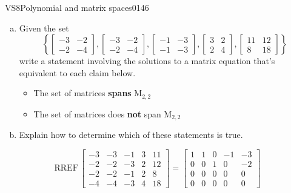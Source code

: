\newpage




\begin{exercise}{VS8}{Polynomial and matrix spaces}{0146} 
\begin{exerciseStatement} 

\begin{enumerate}[(a)]
\item  

 Given the set \[\left\{ \left[\begin{array}{cc}
-3 & -2 \\
-2 & -4
\end{array}\right] , \left[\begin{array}{cc}
-3 & -2 \\
-2 & -4
\end{array}\right] , \left[\begin{array}{cc}
-1 & -3 \\
-1 & -3
\end{array}\right] , \left[\begin{array}{cc}
3 & 2 \\
2 & 4
\end{array}\right] , \left[\begin{array}{cc}
11 & 12 \\
8 & 18
\end{array}\right] \right\}\] write a statement involving the solutions to a matrix equation that's equivalent to each claim below. 

 

\begin{itemize}
\item  

 The set of matrices \textbf{spans} \(\mathrm{M}_{2,2}\) 

 
\item  

 The set of matrices does \textbf{not} span \(\mathrm{M}_{2,2}\) 

 
\end{itemize}

     
\item  

 Explain how to determine which of these statements is true. 

 
\end{enumerate}

     \end{exerciseStatement}
 \begin{exerciseAnswer} 

 \[
\mathrm{RREF}\, \left[\begin{array}{ccccc}
-3 & -3 & -1 & 3 & 11 \\
-2 & -2 & -3 & 2 & 12 \\
-2 & -2 & -1 & 2 & 8 \\
-4 & -4 & -3 & 4 & 18
\end{array}\right] = \left[\begin{array}{ccccc}
1 & 1 & 0 & -1 & -3 \\
0 & 0 & 1 & 0 & -2 \\
0 & 0 & 0 & 0 & 0 \\
0 & 0 & 0 & 0 & 0
\end{array}\right]
            \] 


\end{exerciseAnswer}
\end{exercise}

